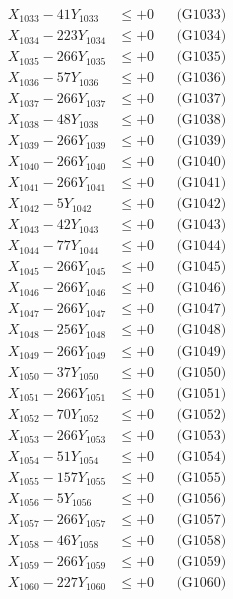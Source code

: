 \documentclass[a4paper,10pt]{article}
\begin{document}
{\begin{align}
X_{1033} - 41Y_{1033} &\leq +0 && \text{(G1033)} \\
X_{1034} - 223Y_{1034} &\leq +0 && \text{(G1034)} \\
X_{1035} - 266Y_{1035} &\leq +0 && \text{(G1035)} \\
X_{1036} - 57Y_{1036} &\leq +0 && \text{(G1036)} \\
X_{1037} - 266Y_{1037} &\leq +0 && \text{(G1037)} \\
X_{1038} - 48Y_{1038} &\leq +0 && \text{(G1038)} \\
X_{1039} - 266Y_{1039} &\leq +0 && \text{(G1039)} \\
X_{1040} - 266Y_{1040} &\leq +0 && \text{(G1040)} \\
\allowbreak
X_{1041} - 266Y_{1041} &\leq +0 && \text{(G1041)} \\
X_{1042} - 5Y_{1042} &\leq +0 && \text{(G1042)} \\
X_{1043} - 42Y_{1043} &\leq +0 && \text{(G1043)} \\
X_{1044} - 77Y_{1044} &\leq +0 && \text{(G1044)} \\
X_{1045} - 266Y_{1045} &\leq +0 && \text{(G1045)} \\
X_{1046} - 266Y_{1046} &\leq +0 && \text{(G1046)} \\
X_{1047} - 266Y_{1047} &\leq +0 && \text{(G1047)} \\
X_{1048} - 256Y_{1048} &\leq +0 && \text{(G1048)} \\
X_{1049} - 266Y_{1049} &\leq +0 && \text{(G1049)} \\
X_{1050} - 37Y_{1050} &\leq +0 && \text{(G1050)} \\
\allowbreak
X_{1051} - 266Y_{1051} &\leq +0 && \text{(G1051)} \\
X_{1052} - 70Y_{1052} &\leq +0 && \text{(G1052)} \\
X_{1053} - 266Y_{1053} &\leq +0 && \text{(G1053)} \\
X_{1054} - 51Y_{1054} &\leq +0 && \text{(G1054)} \\
X_{1055} - 157Y_{1055} &\leq +0 && \text{(G1055)} \\
X_{1056} - 5Y_{1056} &\leq +0 && \text{(G1056)} \\
X_{1057} - 266Y_{1057} &\leq +0 && \text{(G1057)} \\
X_{1058} - 46Y_{1058} &\leq +0 && \text{(G1058)} \\
X_{1059} - 266Y_{1059} &\leq +0 && \text{(G1059)} \\
X_{1060} - 227Y_{1060} &\leq +0 && \text{(G1060)} \\

\end{align}}
\end{document}
